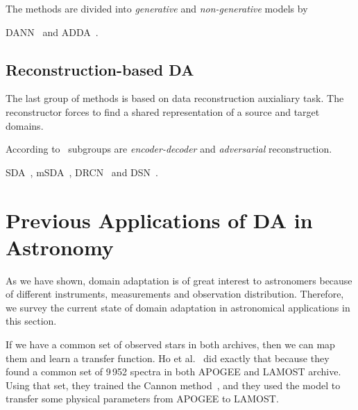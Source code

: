 The methods are divided into \textit{generative} and \textit{non-generative}
models by~\cite{wang2018}

DANN~\cite{ganin2016} and ADDA~\cite{tzeng2017}.

\subsection{Reconstruction-based DA}

The last group of methods is based on data reconstruction auxialiary task.
The reconstructor forces to find a shared representation
of a source and target domains.

According to~\cite{wang2018} subgroups are \textit{encoder-decoder} and
\textit{adversarial} reconstruction.

SDA~\cite{vincent2008, glorot2011}, mSDA~\cite{chen2012}, DRCN~\cite{ghifary2016} and DSN~\cite{bousmalis2016}.

\section{Previous Applications of DA in Astronomy}


As we have shown, domain adaptation is of great interest to astronomers
because of different instruments, measurements and observation distribution.
Therefore, we survey the current state of domain adaptation in astronomical applications in this section.

If we have a common set of observed stars in both archives,
then we can map them and learn a transfer function.
Ho et al.~\cite{ho2017} did exactly that
because they found a common set of 9\,952 spectra in both APOGEE and LAMOST archive.
Using that set, they trained the Cannon method~\cite{ness2015},
and they used the model to transfer some physical parameters from APOGEE to LAMOST.


